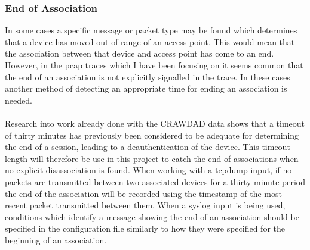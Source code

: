 \subsubsection{End of Association} 
In some cases a specific message or packet type may be found which determines that a device has moved out of range of an access point. This would mean that the association between that device and access point has come to an end. However, in the pcap traces which I have been focusing on it seems common that the end of an association is not explicitly signalled in the trace. In these cases another method of detecting an appropriate time for ending an association is needed. \\\\
Research into work already done with the CRAWDAD data \cite{kotz2002} \cite{henderson2004} shows that a timeout of thirty minutes has previously been considered to be adequate for determining the end of a session, leading to a deauthentication of the device. This timeout length will therefore be use in this project to catch the end of associations when no explicit disassociation is found. 
When working with a tcpdump input, if no packets are transmitted between two associated devices for a thirty minute period the end of the association will be recorded using the timestamp of the most recent packet transmitted between them. When a syslog input is being used, conditions which identify a message showing the end of an association should be specified in the configuration file similarly to how they were specified for the beginning of an association.

